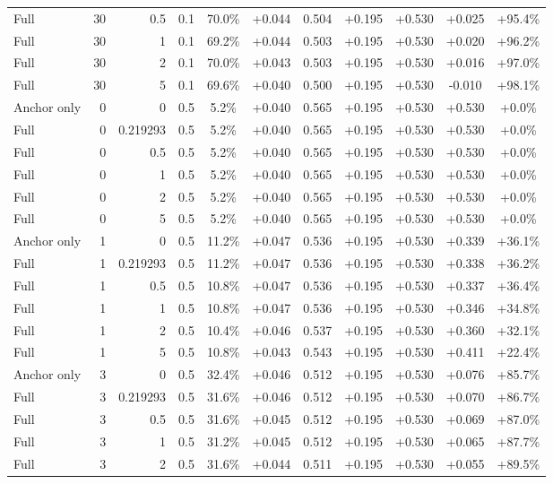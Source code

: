 \begin{table}[htbp]
\begin{tabular}{lrrrccccccc}
Full & 30 & 0.5 & 0.1 & 70.0\% & +0.044 & 0.504 & +0.195 & +0.530 & +0.025 & +95.4\% \\
Full & 30 & 1 & 0.1 & 69.2\% & +0.044 & 0.503 & +0.195 & +0.530 & +0.020 & +96.2\% \\
Full & 30 & 2 & 0.1 & 70.0\% & +0.043 & 0.503 & +0.195 & +0.530 & +0.016 & +97.0\% \\
Full & 30 & 5 & 0.1 & 69.6\% & +0.040 & 0.500 & +0.195 & +0.530 & -0.010 & +98.1\% \\
Anchor only & 0 & 0 & 0.5 & 5.2\% & +0.040 & 0.565 & +0.195 & +0.530 & +0.530 & +0.0\% \\
Full & 0 & 0.219293 & 0.5 & 5.2\% & +0.040 & 0.565 & +0.195 & +0.530 & +0.530 & +0.0\% \\
Full & 0 & 0.5 & 0.5 & 5.2\% & +0.040 & 0.565 & +0.195 & +0.530 & +0.530 & +0.0\% \\
Full & 0 & 1 & 0.5 & 5.2\% & +0.040 & 0.565 & +0.195 & +0.530 & +0.530 & +0.0\% \\
Full & 0 & 2 & 0.5 & 5.2\% & +0.040 & 0.565 & +0.195 & +0.530 & +0.530 & +0.0\% \\
Full & 0 & 5 & 0.5 & 5.2\% & +0.040 & 0.565 & +0.195 & +0.530 & +0.530 & +0.0\% \\
Anchor only & 1 & 0 & 0.5 & 11.2\% & +0.047 & 0.536 & +0.195 & +0.530 & +0.339 & +36.1\% \\
Full & 1 & 0.219293 & 0.5 & 11.2\% & +0.047 & 0.536 & +0.195 & +0.530 & +0.338 & +36.2\% \\
Full & 1 & 0.5 & 0.5 & 10.8\% & +0.047 & 0.536 & +0.195 & +0.530 & +0.337 & +36.4\% \\
Full & 1 & 1 & 0.5 & 10.8\% & +0.047 & 0.536 & +0.195 & +0.530 & +0.346 & +34.8\% \\
Full & 1 & 2 & 0.5 & 10.4\% & +0.046 & 0.537 & +0.195 & +0.530 & +0.360 & +32.1\% \\
Full & 1 & 5 & 0.5 & 10.8\% & +0.043 & 0.543 & +0.195 & +0.530 & +0.411 & +22.4\% \\
Anchor only & 3 & 0 & 0.5 & 32.4\% & +0.046 & 0.512 & +0.195 & +0.530 & +0.076 & +85.7\% \\
Full & 3 & 0.219293 & 0.5 & 31.6\% & +0.046 & 0.512 & +0.195 & +0.530 & +0.070 & +86.7\% \\
Full & 3 & 0.5 & 0.5 & 31.6\% & +0.045 & 0.512 & +0.195 & +0.530 & +0.069 & +87.0\% \\
Full & 3 & 1 & 0.5 & 31.2\% & +0.045 & 0.512 & +0.195 & +0.530 & +0.065 & +87.7\% \\
Full & 3 & 2 & 0.5 & 31.6\% & +0.044 & 0.511 & +0.195 & +0.530 & +0.055 & +89.5\% \\

\end{tabular}
\end{table}
